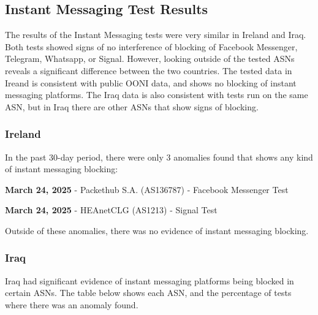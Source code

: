 \subsection{Instant Messaging Test Results}

The results of the Instant Messaging tests were very similar in Ireland and Iraq. Both tests showed signs of no interference of blocking of Facebook Messenger, Telegram, Whatsapp, or Signal. However, looking outside of the tested ASNs reveals a significant difference between the two countries. The tested data in Ireand is consistent with public OONI data, and shows no blocking of instant messaging platforms. The Iraq data is also consistent with tests run on the same ASN, but in Iraq there are other ASNs that show signs of blocking.

\subsubsection{Ireland}

In the past 30-day period, there were only 3 anomalies found that shows any kind of instant messaging blocking:

\textbf{March 24, 2025} - Packethub S.A. (AS136787) - Facebook Messenger Test

\textbf{March 24, 2025} - HEAnetCLG (AS1213) - Signal Test

Outside of these anomalies, there was no evidence of instant messaging blocking.

\subsubsection{Iraq}

Iraq had significant evidence of instant messaging platforms being blocked in certain ASNs. The table below shows each ASN, and the percentage of tests where there was an anomaly found.

